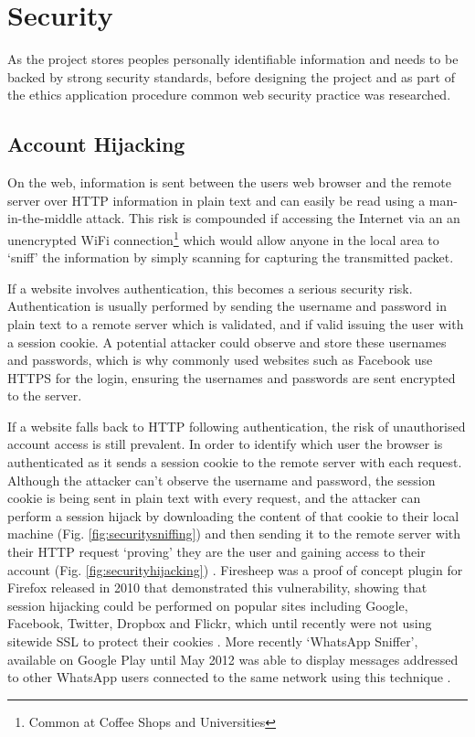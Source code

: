\section{Security}
As the project stores peoples personally identifiable information and needs to be backed by strong security standards, before designing the project and as part of the ethics application procedure common web security practice was researched.

\subsection{Account Hijacking} \label{subsection:account-hijacking}
On the web, information is sent between the users web browser and the remote server over HTTP information in plain text and can easily be read using a man-in-the-middle attack. This risk is compounded if accessing the Internet via an an unencrypted WiFi connection\footnote{Common at Coffee Shops and Universities} which would allow anyone in the local area to `sniff' the information by simply scanning for capturing the transmitted packet.

If a website involves authentication, this becomes a serious security risk. Authentication is usually performed by sending the username and password in plain text to a remote server which is validated, and if valid issuing the user with a session cookie.
%
A potential attacker could observe and store these usernames and passwords, which is why commonly used websites such as Facebook use HTTPS for the login, ensuring the usernames and passwords are sent encrypted to the server.

If a website falls back to HTTP following authentication, the risk of unauthorised account access is still prevalent.
%
In order to identify which user the browser is authenticated as it sends a session cookie to the remote server with each request. 
%
Although the attacker can't observe the username and password, the session cookie is being sent in plain text with every request, and the attacker can perform a session hijack by downloading the content of that cookie to their local machine (Fig. \ref{fig:securitysniffing}) and then sending it to the remote server with their HTTP request `proving' they are the user and gaining access to their account (Fig. \ref{fig:securityhijacking}) \parencite{owasp2011sessionhihacking}.
% 
Firesheep was a proof of concept plugin for Firefox released in 2010 that demonstrated this vulnerability, showing that session hijacking could be performed on popular sites including Google, Facebook, Twitter, Dropbox and Flickr, which until recently were not using sitewide SSL to protect their cookies \parencite{butler2010firesheep, butler2014firesheep}. 
%
More recently `WhatsApp Sniffer', available on Google Play until May 2012 was able to display messages addressed to other WhatsApp users connected to the same network using this technique \parencite{thehsecurity2012whatsapp}.

